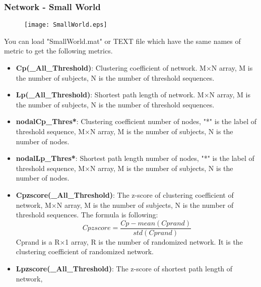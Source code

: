 \documentclass[11pt]{article}
\begin{document}
			\subsubsection{Network - Small World}
				\begin{figure}
					\begin{center}
						\texttt{[image: SmallWorld.eps]}
					\end{center}
				\end{figure}
				You can load "SmallWorld.mat" or TEXT file which have the same names of metric to get the following metrics.
				\begin{itemize}
					\item \textbf{Cp(\_All\_Threshold)}: Clustering coefficient of network.
						M$\times$N array, M is the number of subjects, N is the number of threshold sequences.
					\item \textbf{Lp(\_All\_Threshold)}: Shortest path length of network.
						M$\times$N array, M is the number of subjects, N is the number of threshold sequences.
					\item \textbf{nodalCp\_Thres*}: Clustering coefficient number of nodes, "*" is the label of threshold sequence,
						M$\times$N array, M is the number of subjects, N is the number of nodes.
					\item \textbf{nodalLp\_Thres*}: Shortest path length number of nodes, "*" is the label of threshold sequence,
						M$\times$N array, M is the number of subjects, N is the number of nodes.
					\item \textbf{Cpzscore(\_All\_Threshold)}: The z-score of clustering coefficient of network, 
						M$\times$N array, M is the number of subjects, N is the number of threshold sequences.
						The formula is following:
						$$Cpzscore=\frac{Cp-mean(Cprand)}{std(Cprand)}$$
						Cprand is a R$\times$1 array, R is the number of randomized network. 
						It is the clustering coefficient of randomized network.
					\item \textbf{Lpzscore(\_All\_Threshold)}: The z-score of shortest path length of network,

\end{itemize}
\end{document}
